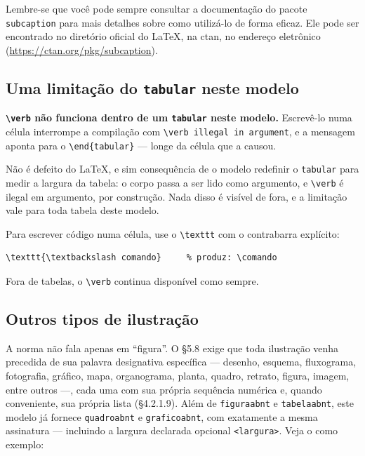 Lembre-se que você pode sempre consultar a documentação do pacote \texttt{subcaption} para mais
detalhes sobre como utilizá-lo de forma eficaz. Ele pode ser encontrado no diretório oficial do
\LaTeX, na \gls{ctan}, no endereço eletrônico (\url{https://ctan.org/pkg/subcaption}).

\subsection{Uma limitação do \texttt{tabular} neste modelo}\label{ssc:verb-tabular}

\textbf{\texttt{\textbackslash verb} não funciona dentro de um \texttt{tabular} neste modelo.}
Escrevê-lo numa célula interrompe a compilação com \texttt{\textbackslash verb illegal in
argument}, e a mensagem aponta para o \texttt{\textbackslash end\{tabular\}} --- longe da célula
que a causou.

Não é defeito do \LaTeX{}, e sim consequência de o modelo redefinir o \texttt{tabular} para medir a
largura da tabela: o corpo passa a ser lido como argumento, e \texttt{\textbackslash verb} é
ilegal em argumento, por construção. Nada disso é visível de fora, e a limitação vale para toda
tabela deste modelo.

Para escrever código numa célula, use o \texttt{\textbackslash texttt} com o contrabarra
explícito:

\begin{Verbatim}[fontsize=\small]
\texttt{\textbackslash comando}     % produz: \comando
\end{Verbatim}

\noindent Fora de tabelas, o \texttt{\textbackslash verb} continua disponível como sempre.

\subsection{Outros tipos de ilustração}\label{sec:tipos-ilustracao}

A norma não fala apenas em ``figura''. O §5.8 exige que toda ilustração venha precedida de sua
palavra designativa específica — desenho, esquema, fluxograma, fotografia, gráfico, mapa,
organograma, planta, quadro, retrato, figura, imagem, entre outros —, cada uma com sua própria
sequência numérica e, quando conveniente, sua própria lista (§4.2.1.9). Além de \texttt{figuraabnt}
e \texttt{tabelaabnt}, este modelo já fornece \texttt{quadroabnt} e \texttt{graficoabnt}, com
exatamente a mesma assinatura — incluindo a largura declarada opcional \texttt{<largura>}. Veja o
 como exemplo:

